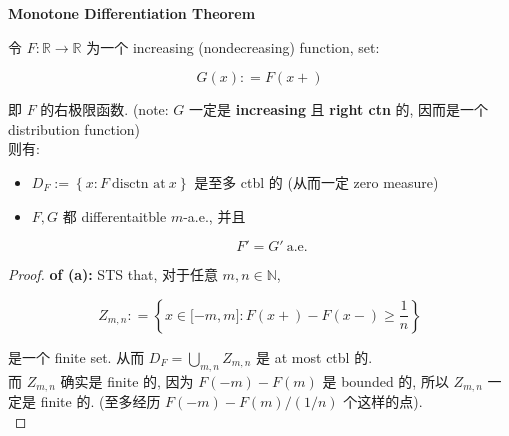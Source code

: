 \documentclass{qlnotes-export}
\begin{document}
\begin{theorem}{\protect{}\label{kn-monotone-differentiation-theorem}{\textbf{Monotone
Differentiation Theorem}}}

令 \(F:{\mathbb{R}}\rightarrow{\mathbb{R}}\) 为一个 increasing (nondecreasing) function, set:

\[G(x): = F(x + )\]

即 \(F\) 的右极限函数. (note: \(G\) 一定是 \textbf{increasing} 且 \textbf{right ctn} 的, 因而是一个 distribution function)\\
则有:

\begin{itemize}
\item
  \(D_{F} := \left\{ {x:F\ \text{disctn at}\ x} \right\}\) 是至多 ctbl 的 (从而一定 zero measure)
\item
  \(F,G\) 都 differentaitble \(m\)-a.e., 并且

  \[F' = G'\ \text{a.e.}\]
\end{itemize}

\end{theorem}

\begin{proof}

\textbf{of (a):} STS that, 对于任意 \(m,n \in {\mathbb{N}}\),

\[Z_{m,n}: = \left\{ {x \in \lbrack - m,m\rbrack:F(x + ) - F(x - ) \geq \frac{1}{n}} \right\}\]

是一个 finite set. 从而 \(D_{F} = \bigcup_{m,n}Z_{m,n}\) 是 at most ctbl 的.\\
而 \(Z_{m,n}\) 确实是 finite 的, 因为 \(F( - m) - F(m)\) 是 bounded 的, 所以 \(Z_{m,n}\) 一定是 finite 的. (至多经历 \(F( - m) - F(m)/(1/n)\) 个这样的点).\\

\end{proof}
\end{document}
